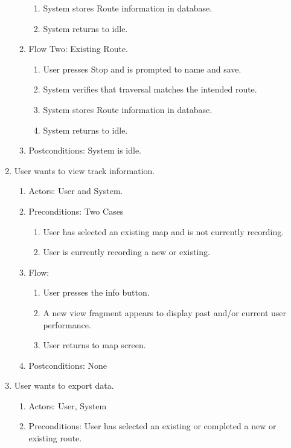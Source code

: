 ﻿\documentclass{article}
\begin{document}
\begin{enumerate}
\begin{enumerate}
\begin{enumerate}
            \item System stores Route information in database.
            \item System returns to idle.
            \end{enumerate}
        \item Flow Two: Existing Route.
            \begin{enumerate}
            \item User presses Stop and is prompted to name and save.
            \item System verifies that traversal matches the intended route.
            \item System stores Route information in database.
            \item System returns to idle.
            \end{enumerate}
        \item Postconditions: System is idle.
    \end{enumerate}
\item User wants to view track information.
    \begin{enumerate}
        \item Actors: User and System.
        \item Preconditions: Two Cases
            \begin{enumerate}
            \item User has selected an existing map and is not currently recording.
            \item User is currently recording a new or existing.
            \end{enumerate}
        \item Flow:
            \begin{enumerate}
            \item User presses the info button.
            \item A new view fragment appears to display past and/or current user performance.
            \item User returns to map screen.
            \end{enumerate}
        \item Postconditions: None
    \end{enumerate}
\item User wants to export data.
    \begin{enumerate}
        \item Actors: User, System
        \item Preconditions: User has selected an existing or completed a new or existing route.

\end{enumerate}
\end{enumerate}
\end{document}
